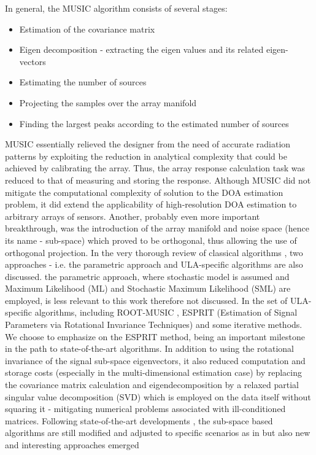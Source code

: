 In general, the MUSIC algorithm consists of several stages:
\begin{itemize}
    \item Estimation of the covariance matrix
    \item Eigen decomposition - extracting the eigen values and its related eigen-vectors
    \item Estimating the number of sources
    \item Projecting the samples over the array manifold
    \item Finding the largest peaks according to the estimated number of sources
\end{itemize}
MUSIC essentially relieved the designer from the need of accurate radiation patterns by exploiting the reduction in analytical complexity that could be achieved by calibrating the array.
Thus, the array response calculation task was reduced to that of measuring and storing the response. 
Although MUSIC did not mitigate the computational complexity of solution to the DOA estimation problem, it did extend the applicability of high-resolution DOA estimation to arbitrary arrays of sensors.
Another, probably even more important breakthrough, was the introduction of the array manifold and noise space (hence its name - sub-space) which proved to be orthogonal, thus allowing the use of orthogonal projection.
In the very thorough review of classical algorithms \cite{TWODECADES}, two approaches - i.e. the parametric approach and ULA-specific algorithms are also discussed.
the parametric approach, where stochastic model is assumed and Maximum Likelihood (ML) and Stochastic Maximum Likelihood (SML) are employed, is less relevant to this work therefore not discussed.
In the set of ULA-specific algorithms, including ROOT-MUSIC \cite{ROOT_MUSIC}, ESPRIT (Estimation of Signal Parameters via Rotational Invariance Techniques) \cite{ESPRIT} and some iterative methods.
We choose to emphasize on the ESPRIT method, being an important milestone in the path to state-of-the-art algorithms.
In addition to using the rotational invariance of the signal sub-space eigenvectors, it also reduced computation and storage costs (especially in the multi-dimensional estimation case) by replacing the covariance matrix calculation and eigendecomposition by a relaxed partial singular value decomposition (SVD) which is employed on the data itself without squaring it - mitigating numerical problems associated with ill-conditioned matrices.
Following state-of-the-art developments \cite{BOOK-classicalAndModernDOA}, the sub-space based algorithms are still modified and adjusted to specific scenarios as in \cite{LpNorm MUSIC} but also new and interesting approaches emerged
